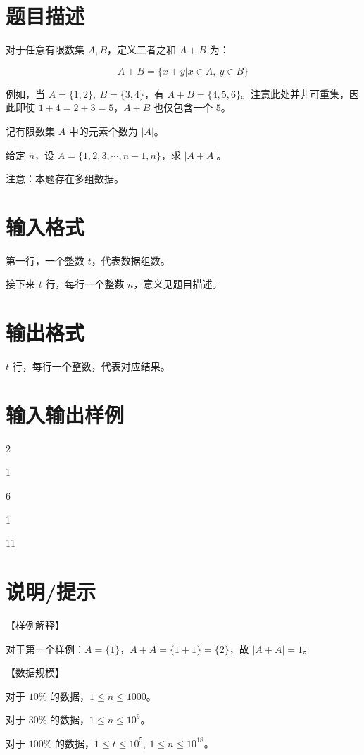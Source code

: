 \documentclass{../cpct/ctpro}
\begin{document}
\makeproblem
\section*{题目描述}

对于任意有限数集 $A,B$，定义二者之和 $A+B$ 为：

$$A+B = \{x+y | x \in A,~y \in B \}$$

例如，当 $A=\{1,2 \},~B=\{3,4 \}$，有 $A+B = \{4,5,6 \}$。注意此处并非可重集，因此即使 $1+4 = 2+3 =5$，$A+B$ 也仅包含一个 $5$。

记有限数集 $A$ 中的元素个数为 $|A|$。

给定 $n$，设 $A=\{1,2,3,\cdots,n-1,n \}$，求 $|A+A|$。

注意：本题存在多组数据。

\section*{输入格式}

第一行，一个整数 $t$，代表数据组数。

接下来 $t$ 行，每行一个整数 $n$，意义见题目描述。

\section*{输出格式}

$t$ 行，每行一个整数，代表对应结果。

\section*{输入输出样例}
\testcasetab
{
    2 \par
    1 \par
    6
}
{
    1 \par
    11
}

\section*{说明/提示}

【样例解释】

对于第一个样例：$A = \{1 \}，A+A = \{1+1 \} = \{2 \}$，故 $|A+A| = 1$。

【数据规模】

对于 $10 \%$ 的数据，$1 \leq n \leq 1000$。

对于 $30 \%$ 的数据，$1 \leq n \leq {10}^9$。

对于 $100 \%$ 的数据，$1 \leq t \leq {10}^5,~1 \leq n \leq {10}^{18}$。
\end{document}
